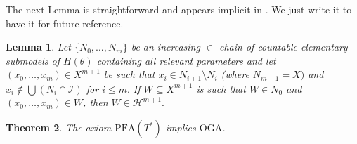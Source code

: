 \documentclass{amsart}
\newtheorem{theorem}{Theorem}[section]
\newtheorem{lemma}[theorem]{Lemma}
\theoremstyle{definition}
\newcommand{\PFA}{\mathrm{PFA}}
\newcommand{\OGA}{\mathrm{OGA}}
\begin{document}
The next Lemma is straightforward and appears implicit in \cite{Todorcevic2011}. We just write it to have it for future reference.
\begin{lemma}
    Let $\{N_0,\dots,N_{m}\}$ be an increasing $\in$-chain of countable elementary submodels of $H(\theta)$ containing all relevant parameters and let $(x_0,\dots,x_{m})\in X^{m+1}$ be such that $x_i\in N_{i+1}\setminus N_i$ (where $N_{m+1}=X)$ and $x_i\notin \bigcup (N_i\cap \mathcal{I})$ for $i\leq m.$ If $W\subseteq X^{m+1}$ is such that $W\in N_0 $ and $(x_0,\dots,x_m)\in W$, then $W\in \mathcal{H}^{m+1}.$
\end{lemma}

\begin{theorem}
    The axiom  $\PFA(T^*)$ implies $\OGA$.
\end{theorem}
\end{document}
